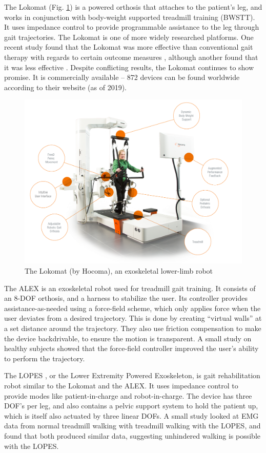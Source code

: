 \documentclass[12pt]{report}
\begin{document}
	The Lokomat (Fig. \ref{fig:Lokomat}) is a powered orthosis that attaches to the patient's leg, and works in conjunction with body-weight supported treadmill training (BWSTT). It uses impedance control to provide programmable assistance to the leg through gait trajectories. The Lokomat is one of more widely researched platforms. One recent study found that the Lokomat was more effective than conventional gait therapy with regards to certain outcome measures \cite{Nam2017}, although another found that it was less effective \cite{Hidler2008}. Despite conflicting results, the Lokomat continues to show promise. It is commercially available -- 872 devices can be found worldwide according to their website (as of 2019).
			
	\begin{figure}[h] 
		\centering
		\includegraphics[width=0.75\linewidth]{Lokomat}
		\caption{The Lokomat (by Hocoma), an exoskeletal lower-limb robot}
		\label{fig:Lokomat}
	\end{figure}
	
	The ALEX \cite{Banala2007} is an exoskeletal robot used for treadmill gait training. It consists of an 8-DOF orthosis, and a harness to stabilize the user. Its controller provides assistance-as-needed using a force-field scheme, which only applies force when the user deviates from a desired trajectory. This is done by creating ``virtual walls'' at a set distance around the trajectory. They also use friction compensation to make the device backdrivable, to ensure the motion is transparent. A small study on healthy subjects showed that the force-field controller improved the user's ability to perform the trajectory. 
	
	The LOPES \cite{Veneman2007}, or the Lower Extremity Powered Exoskeleton, is gait rehabilitation robot similar to the Lokomat and the ALEX. It uses impedance control to provide modes like patient-in-charge and robot-in-charge. The device has three DOF's per leg, and also contains a pelvic support system to hold the patient up, which is itself also actuated by three linear DOFs. A small study looked at EMG data from normal treadmill walking with treadmill walking with the LOPES, and found that both produced similar data, suggesting unhindered walking is possible with the LOPES.
	
\end{document}
